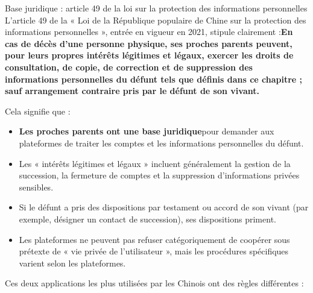 \begin{tcbinfo}{Base juridique : article 49 de la loi sur la protection des informations personnelles}
L'article 49 de la « Loi de la République populaire de Chine sur la protection des informations personnelles », entrée en vigueur en 2021, stipule clairement :\textbf{En cas de décès d'une personne physique, ses proches parents peuvent, pour leurs propres intérêts légitimes et légaux, exercer les droits de consultation, de copie, de correction et de suppression des informations personnelles du défunt tels que définis dans ce chapitre ; sauf arrangement contraire pris par le défunt de son vivant.}

Cela signifie que :

\begin{itemize}
  \item \textbf{Les proches parents ont une base juridique}pour demander aux plateformes de traiter les comptes et les informations personnelles du défunt.
  \item Les « intérêts légitimes et légaux » incluent généralement la gestion de la succession, la fermeture de comptes et la suppression d'informations privées sensibles.
  \item Si le défunt a pris des dispositions par testament ou accord de son vivant (par exemple, désigner un contact de succession), ses dispositions priment.
  \item Les plateformes ne peuvent pas refuser catégoriquement de coopérer sous prétexte de « vie privée de l'utilisateur », mais les procédures spécifiques varient selon les plateformes.
\end{itemize}

\end{tcbinfo}


Ces deux applications les plus utilisées par les Chinois ont des règles différentes :

